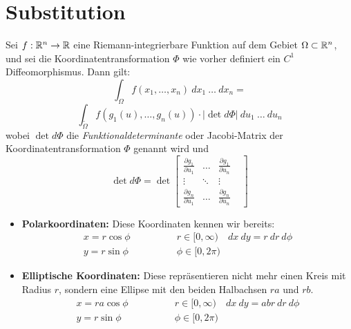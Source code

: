 \section{Substitution}

\begin{theorem}[Substitutionsregel in $\R^n$]
    Sei $f :\mathbb{R}^n \to \mathbb{R}$ eine Riemann-integrierbare Funktion auf dem Gebiet $\Omega \subset \mathbb{R}^n$, und sei die Koordinatentransformation $\Phi$ wie vorher definiert ein $C^1$ Diffeomorphismus. Dann gilt:
    $$ \int_\Omega f(x_1, \dots, x_n) \: dx_1 \: \dots \: dx_n =$$
    $$\int_{\widetilde{\Omega}} f(g_1(u), \dots, g_n(u)) \cdot |\det d \Phi| \: du_1 \: \dots \: du_n$$
    wobei $\det d \Phi$ die \textit{Funktionaldeterminante} oder Jacobi-Matrix der Koordinatentransformation $\Phi$ genannt wird und 
    $$\det d\Phi = \det 
    \begin{bmatrix} 
        \frac{\partial g_1}{\partial u_1}   & \dots  & \frac{\partial g_1}{\partial u_n} & \\
        \vdots                              & \ddots & \vdots & \\
        \frac{\partial g_n}{\partial u_1}   & \dots  & \frac{\partial g_n}{\partial u_n}
    \end{bmatrix}$$
\end{theorem}

\begin{concept}[Koordinatentransformationen in $\R^2$]
    \begin{itemize}
        \item \textbf{Polarkoordinaten:} Diese Koordinaten kennen wir bereits:
        \begin{align*}
             x = r \cos \phi \quad \quad \quad \quad & r \in [0, \infty) &  dx\: dy = r \: dr \: d\phi\\
             y = r \sin \phi \quad \quad \quad \quad  & \phi \in [0, 2\pi) &
        \end{align*}
        \item \textbf{Elliptische Koordinaten:} Diese repräsentieren nicht mehr einen Kreis mit Radius $r$, sondern eine Ellipse mit den beiden Halbachsen $ra$ und $rb$.
        \begin{align*}
             x = r a \cos \phi \quad \quad \quad \quad & r \in [0, \infty) &  dx\: dy = ab r \: dr \: d\phi\\
             y = r \sin \phi \quad \quad \quad \quad  & \phi \in [0, 2\pi) &
        \end{align*}
    \end{itemize} 
\end{concept}

